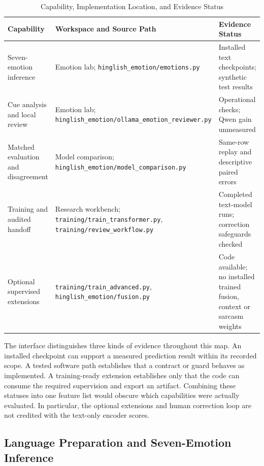 \documentclass[journal]{IEEEtran}
\begin{document}
\begin{table}[!t]
\caption{Capability, Implementation Location, and Evidence Status}\label{tab:feature_traceability}
\centering
\footnotesize
\begin{tabularx}{\textwidth}{@{}>{\raggedright\arraybackslash}X>{\raggedright\arraybackslash}X>{\raggedright\arraybackslash}X@{}}
\toprule
\textbf{Capability} & \textbf{Workspace and Source Path} & \textbf{Evidence Status} \\
\midrule
Seven-emotion inference & Emotion lab; \texttt{hinglish\_\allowbreak{}emotion/\allowbreak{}emotions.py} & Installed text checkpoints; synthetic test results \\
Cue analysis and local review & Emotion lab; \texttt{hinglish\_\allowbreak{}emotion/\allowbreak{}ollama\_\allowbreak{}emotion\_\allowbreak{}reviewer.py} & Operational checks; Qwen gain unmeasured \\
Matched evaluation and disagreement & Model comparison; \texttt{hinglish\_\allowbreak{}emotion/\allowbreak{}model\_\allowbreak{}comparison.py} & Same-row replay and descriptive paired errors \\
Training and audited handoff & Research workbench; \texttt{training/\allowbreak{}train\_\allowbreak{}transformer.py}, \texttt{training/\allowbreak{}review\_\allowbreak{}workflow.py} & Completed text-model runs; correction safeguards checked \\
Optional supervised extensions & \texttt{training/\allowbreak{}train\_\allowbreak{}advanced.py}, \texttt{hinglish\_\allowbreak{}emotion/\allowbreak{}fusion.py} & Code available; no installed trained fusion, context or sarcasm weights \\
\bottomrule
\end{tabularx}
\end{table}


The interface distinguishes three kinds of evidence throughout this map. An installed checkpoint can support a measured prediction result within its recorded scope. A tested software path establishes that a contract or guard behaves as implemented. A training-ready extension establishes only that the code can consume the required supervision and export an artifact. Combining these statuses into one feature list would obscure which capabilities were actually evaluated. In particular, the optional extensions and human correction loop are not credited with the text-only encoder scores.

\subsection{Language Preparation and Seven-Emotion Inference}
\end{document}
